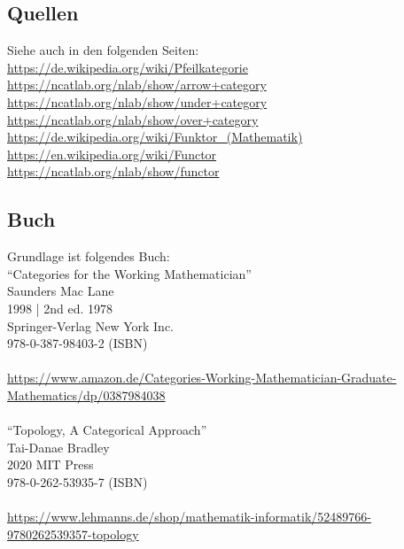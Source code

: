 \documentclass[a4paper]{amsart}
\theoremstyle{definition}
\begin{document}
\subsection*{Quellen}
Siehe auch in den folgenden Seiten:\\
\url{https://de.wikipedia.org/wiki/Pfeilkategorie}\\
\url{https://ncatlab.org/nlab/show/arrow+category}\\
\url{https://ncatlab.org/nlab/show/under+category}\\
\url{https://ncatlab.org/nlab/show/over+category}\\
\url{https://de.wikipedia.org/wiki/Funktor_(Mathematik)}\\
\url{https://en.wikipedia.org/wiki/Functor}\\
\url{https://ncatlab.org/nlab/show/functor}

\subsection*{Buch}
Grundlage ist folgendes Buch:\\
"`Categories for the Working Mathematician"'\\
Saunders Mac Lane\\
1998 | 2nd ed. 1978\\
Springer-Verlag New York Inc.\\
978-0-387-98403-2 (ISBN)\\
\\
\url{https://www.amazon.de/Categories-Working-Mathematician-Graduate-Mathematics/dp/0387984038}\\
\\
"`Topology, A Categorical Approach"'\\
Tai-Danae Bradley\\
2020 MIT Press\\
978-0-262-53935-7 (ISBN)\\ 
\\
\url{https://www.lehmanns.de/shop/mathematik-informatik/52489766-9780262539357-topology}

\end{document}
